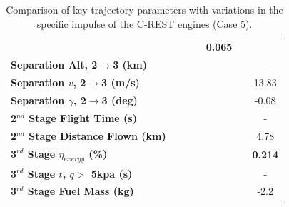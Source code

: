 \begin{table}[ht!]
\begin{tabular}{l c c c c c c}
		& \textbf{\secondExergyEffIspStandardNoReturn}
		& \textbf{\secondExergyEffIspOneHundredFiveNoReturn}
		& \textbf{\secondExergyEffIspOneHundredTenNoReturn}
		& \textbf{0.065}
		\\
		\textbf{Separation Alt, 2$\rightarrow$3 (km)}
		& \secondthirdSeparationAltIspNinetyNoReturn
		& \secondthirdSeparationAltIspNinetyFiveNoReturn
		& \secondthirdSeparationAltIspStandardNoReturn
		& \secondthirdSeparationAltIspOneHundredFiveNoReturn
		& \secondthirdSeparationAltIspOneHundredTenNoReturn
		& -
		\\
		\textbf{Separation $v$, 2$\rightarrow$3 (m/s)}
		& \secondthirdSeparationvIspNinetyNoReturn
		& \secondthirdSeparationvIspNinetyFiveNoReturn
		& \secondthirdSeparationvIspStandardNoReturn
		& \secondthirdSeparationvIspOneHundredFiveNoReturn
		& \secondthirdSeparationvIspOneHundredTenNoReturn
		&13.83
		\\
		\textbf{Separation $\gamma$, 2$\rightarrow$3 (deg)}
		& \secondthirdSeparationgammaIspNinetyNoReturn
		& \secondthirdSeparationgammaIspNinetyFiveNoReturn
		& \secondthirdSeparationgammaIspStandardNoReturn
		& \secondthirdSeparationgammaIspOneHundredFiveNoReturn
		& \secondthirdSeparationgammaIspOneHundredTenNoReturn
		&-0.08
		\\
		\textbf{2$^{nd}$ Stage Flight Time (s)}
		& \secondFlightTimeIspNinetyNoReturn
		& \secondFlightTimeIspNinetyFiveNoReturn
		& \secondFlightTimeIspStandardNoReturn
		& \secondFlightTimeIspOneHundredFiveNoReturn
		& \secondFlightTimeIspOneHundredTenNoReturn
		& -
		\\
		\textbf{2$^{nd}$ Stage Distance Flown (km)}
		& \SecondDistIspNinetyNoReturn
		& \SecondDistIspNinetyFiveNoReturn
		& \SecondDistIspStandardNoReturn
		& \SecondDistIspOneHundredFiveNoReturn
		& \SecondDistIspOneHundredTenNoReturn
		&4.78
		\\
		\hline 
		\textbf{3$^{rd}$ Stage $\eta_{exergy}$ (\%)}
		& \textbf{\thirddExergyEffIspNinetyNoReturn}
		& \textbf{\thirddExergyEffIspNinetyFiveNoReturn}
		& \textbf{\thirddExergyEffIspStandardNoReturn}
		& \textbf{\thirddExergyEffIspOneHundredFiveNoReturn}
		& \textbf{\thirddExergyEffIspOneHundredTenNoReturn}
		& \textbf{0.214}
		\\
		\textbf{3$^{rd}$ Stage $t$, $q >$ 5kpa (s)}
		& \thirdqOverFiveIspNinetyNoReturn
		& \thirdqOverFiveIspNinetyFiveNoReturn
		& \thirdqOverFiveIspStandardNoReturn
		& \thirdqOverFiveIspOneHundredFiveNoReturn
		& \thirdqOverFiveIspOneHundredTenNoReturn
		& -
		\\
		\textbf{3$^{rd}$ Stage Fuel Mass (kg)}
		& \thirdmFuelIspNinetyNoReturn
		& \thirdmFuelIspNinetyFiveNoReturn
		& \thirdmFuelIspStandardNoReturn
		& \thirdmFuelIspOneHundredFiveNoReturn
		& \thirdmFuelIspOneHundredTenNoReturn
		&-2.2
		\\
		\hline 
	\end{tabular} 

	
	\caption{Comparison of key trajectory parameters with variations in the specific impulse of the C-REST engines (Case 5).}
	\label{tab:comparison30}
\end{table}
